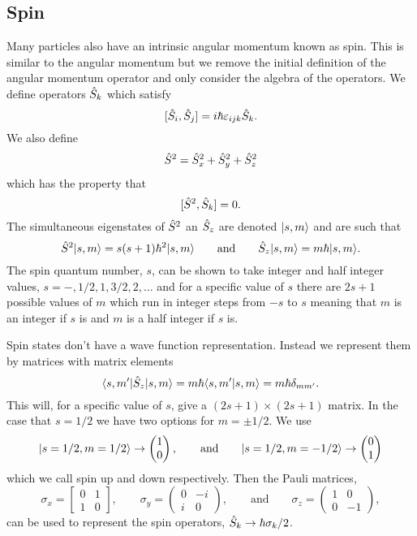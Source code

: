 \subsection{Spin}
Many particles also have an intrinsic angular momentum known as spin.
This is similar to the angular momentum but we remove the initial definition of the angular momentum operator and only consider the  algebra of the operators.
We define operators \(\hat{S}_k\) which satisfy
\[[\hat{S}_i, \hat{S}_j] = i\hbar\varepsilon_{ijk}\hat{S}_k.\]
We also define
\[\hat{S}^2 = \hat{S}_x^2 + \hat{S}_y^2 + \hat{S}_z^2\]
which has the property that
\[[\hat{S}^2, \hat{S}_k] = 0.\]
The simultaneous eigenstates of \(\hat{S}^2\) an \(\hat{S}_z\) are denoted \(\vert {s, m} \rangle\) and are such that
\[\hat{S}^2\vert {s, m} \rangle = s(s + 1)\hbar^2\vert {s, m} \rangle \qquad \text{and}\qquad \hat{S}_z\vert {s, m} \rangle = m\hbar\vert {s, m} \rangle.\]
The spin quantum number, \(s\), can be shown to take integer and half integer values, \(s = -, 1/2, 1, 3/2, 2, \dotsc\) and for a specific value of \(s\) there are \(2s + 1\) possible values of \(m\) which run in integer steps from \(-s\) to \(s\) meaning that \(m\) is an integer if \(s\) is and \(m\) is a half integer if \(s\) is.

Spin states don't have a wave function representation.
Instead we represent them by matrices with matrix elements
\[\langle {s, m'} \vert\hat{S}_z\vert {s, m} \rangle = m\hbar\langle {s, m'} \vert {s, m} \rangle = m\hbar\delta_{mm'}.\]
This will, for a specific value of \(s\), give a \((2s + 1)\times(2s +1)\) matrix.
In the case that \(s = 1/2\) we have two options for \(m = \pm 1/2\).
We use
\[
\vert {s=1/2, m=1/2} \rangle \mathrel{\rightarrow} 
\begin{pmatrix}
    1\\ 0
\end{pmatrix}
,\qquad\text{and}\qquad
\vert {s=1/2, m=-1/2} \rangle \mathrel{\rightarrow}
\begin{pmatrix}
    0\\ 1
\end{pmatrix}
\]
which we call spin up and down respectively.
Then the Pauli matrices, 
\[
\sigma_x = 
\begin{bmatrix}
    0 & 1\\
    1 & 0
\end{bmatrix}
, \qquad \sigma_y =
\begin{pmatrix}
    0 & -i\\
    i & 0
\end{pmatrix}
, \qquad\text{and}\qquad \sigma_z =
\begin{pmatrix}
    1 & 0\\
    0 & -1
\end{pmatrix}
,
\]
can be used to represent the spin operators, \(\hat{S}_k \mathrel{\rightarrow} \hbar\sigma_k/2\).

